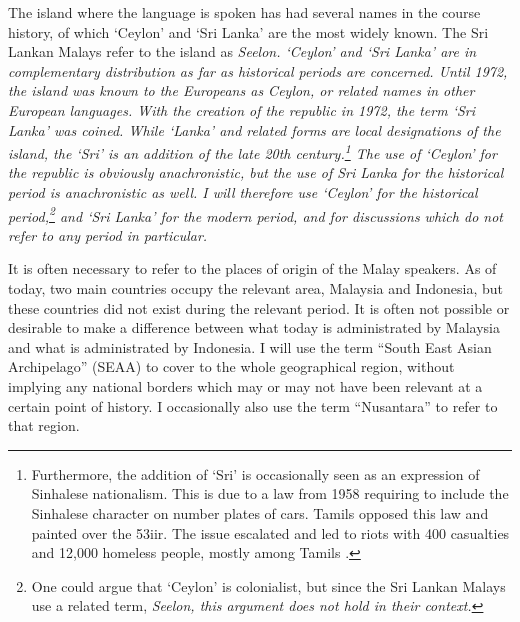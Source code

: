 The island where the language is spoken has had several names in the course history, of which `Ceylon' and `Sri Lanka' are the most widely known. The Sri Lankan Malays refer to the island as \em Seelon\em. `Ceylon' and `Sri Lanka' are in complementary distribution as far as historical periods are concerned. Until 1972, the island was known to the Europeans as Ceylon, or related names in other European languages. With the creation of the republic in 1972, the term `Sri Lanka' was coined. While `Lanka' and related forms are local designations of the island, the `Sri' is an addition of the late 20th century.\footnote{Furthermore, the addition of `Sri' is occasionally seen as an expression of Sinhalese nationalism. This is due to a law from 1958 requiring to include the Sinhalese character  on number plates of cars. Tamils opposed this law and painted over the {\SHb\char53iir}. The issue escalated and led to riots with 400 casualties and 12,000 homeless people, mostly among Tamils \citep[35f]{NissanEtAl1990}.} The use of `Ceylon' for the republic is obviously anachronistic, but the use of Sri Lanka for the historical period is anachronistic as well. I will therefore use `Ceylon' for the historical period,\footnote{One could argue that `Ceylon' is colonialist, but since the Sri Lankan Malays use a related term, \em Seelon\em, this argument does not hold in their context.} and `Sri Lanka' for the modern period, and for discussions which do not refer to any period in particular.

It is often necessary to refer to the places of origin of the Malay speakers. As of today, two main countries occupy the relevant area, Malaysia and Indonesia, but these countries did not exist during the relevant period. It is often not possible or desirable to make a difference between what today is administrated by Malaysia and what is administrated by Indonesia. I will use the term ``South East Asian Archipelago'' (SEAA) to cover to the whole geographical region, without implying any national borders which may or may not have been relevant at a certain point of history. I occasionally also use the term ``Nusantara'' to refer to that region.